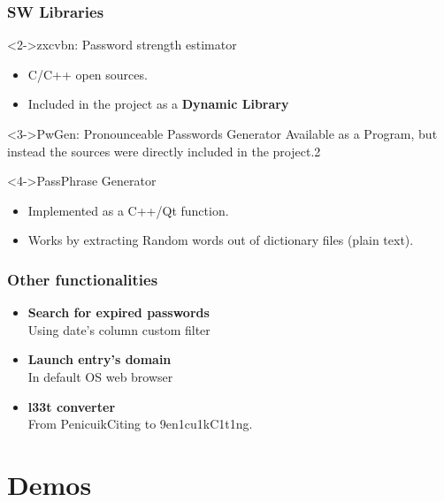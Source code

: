 \documentclass[14pt,usenames,dvipsnames]{beamer}
\begin{document}
\begin{frame}
  \frametitle{SW Libraries}
	  \begin{block}<2->{zxcvbn: Password strength estimator}
		\begin{itemize}
			\item C/C++ open sources.
			\item Included in the project as a \textbf{\color{NavyBlue} Dynamic Library}
		\end{itemize}
	\end{block}


	\begin{block}<3->{PwGen: Pronounceable Passwords Generator}
    Available as a Program, but instead the sources were directly included in the project.2
  \end{block}

	\begin{block}<4->{PassPhrase Generator}
		\begin{itemize}
		  \item Implemented as a C++/Qt function.
		  \item Works by extracting Random words out of dictionary files (plain text).
		\end{itemize}
  \end{block}
\end{frame}

\begin{frame}
	\frametitle{Other functionalities}
  \begin{itemize}
  	\setlength\itemsep{25pt}
    \item<3-> \textbf{Search for expired passwords} \\
    Using date's column custom filter
    \item<4-> \textbf{Launch entry's domain} \\
    In default OS web browser
    \item<5-> \textbf{l33t converter} \\
    From {\color{NavyBlue} PenicuikCiting} to {\color{NavyBlue} 9en1cu1kC1t1ng}.

  \end{itemize}  	
	
\end{frame}




\section{Demos}
\end{document}

